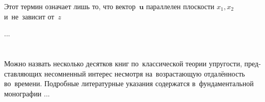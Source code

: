 \begin{otherlanguage}{russian}


\label{para:planedeformation.linearclassicalelasticity}

Этот термин означает лишь то, что вектор~$\bm{u}$ параллелен плоскости $x_1, x_2$ и~не~зависит от~$z$

...




\vspace{8mm}
\hfill\begin{minipage}[b]{0.95\linewidth}
\fontsize{10}{12}\selectfont

\section*{\wordforbibliography}

Можно назвать несколько десятков книг по~классической теории упругости, представляющих несомненный интерес несмотря на~возрастающую отдалённость во~времени. Подробные литературные указания содержатся в~фундаментальной монографии ...

\end{minipage}

\end{otherlanguage}
